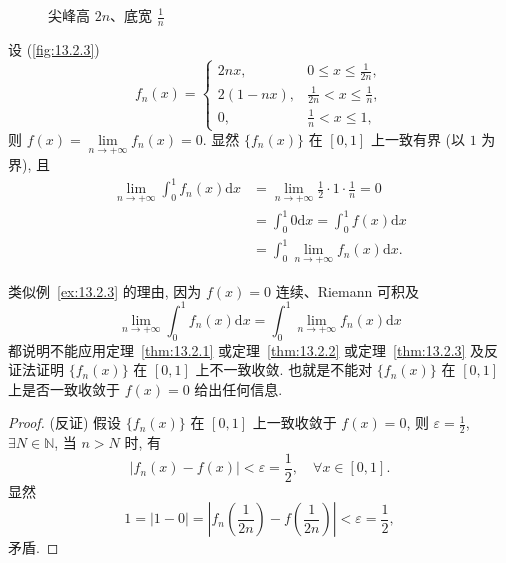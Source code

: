 \begin{figure}[htbp]
  \centering
  \caption{尖峰高 $2n$、底宽 $\frac{1}{n}$}\label{fig:13.2.2}
\end{figure}

\begin{example}\label{ex:13.2.4}
设 (\cref{fig:13.2.3})
\[
  f_{n}(x)=\begin{cases}
    2nx, & 0\leqslant x\leqslant\frac{1}{2n},\\
    2(1-nx), & \frac{1}{2n}<x\leqslant\frac{1}{n},\\
    0, & \frac{1}{n}<x\leqslant1,
\end{cases}
\]
则 $f(x)=\lim\limits_{n\to+\infty}f_{n}(x)=0$. 显然 $\{f_{n}(x)\}$ 在 $[0,1]$ 上一致有界 (以 $1$ 为界), 且
\[
  \begin{aligned}
    \lim_{n\to+\infty}\int_{0}^{1}f_{n}(x)\mathrm{d}x&=\lim_{n\to+\infty}\frac{1}{2}\cdot1\cdot\frac{1}{n}=0\\
    &=\int_{0}^{1}0\mathrm{d}x=\int_{0}^{1}f(x)\mathrm{d}x\\
    &=\int_{0}^{1}\lim_{n\to+\infty}f_{n}(x)\mathrm{d}x.
  \end{aligned}
\]
\end{example}

类似例~\ref{ex:13.2.3} 的理由, 因为 $f(x)=0$ 连续、Riemann 可积及
\[
  \lim_{n\to+\infty}\int_{0}^{1}f_{n}(x)\mathrm{d}x=\int_{0}^{1}\lim_{n\to+\infty}f_{n}(x)\mathrm{d}x
\]
都说明不能应用定理~\ref{thm:13.2.1} 或定理~\ref{thm:13.2.2} 或定理~\ref{thm:13.2.3} 及反证法证明 $\{f_{n}(x)\}$ 在 $[0,1]$ 上不一致收敛. 也就是不能对 $\{f_{n}(x)\}$ 在 $[0,1]$ 上是否一致收敛于 $f(x)=0$ 给出任何信息.

\begin{proof}
(反证) 假设 $\{f_{n}(x)\}$ 在 $[0,1]$ 上一致收敛于 $f(x)=0$, 则 $\varepsilon=\frac{1}{2}$, $\exists N\in\mathbb{N}$, 当 $n>N$ 时, 有
\[
  |f_{n}(x)-f(x)|<\varepsilon=\frac{1}{2},\quad\forall x\in[0,1].
\]
显然
\[
  1=|1-0|=\left|f_{n}\left(\frac{1}{2n}\right)-f\left(\frac{1}{2n}\right)\right|<\varepsilon=\frac{1}{2},
\]
矛盾.
\end{proof}

